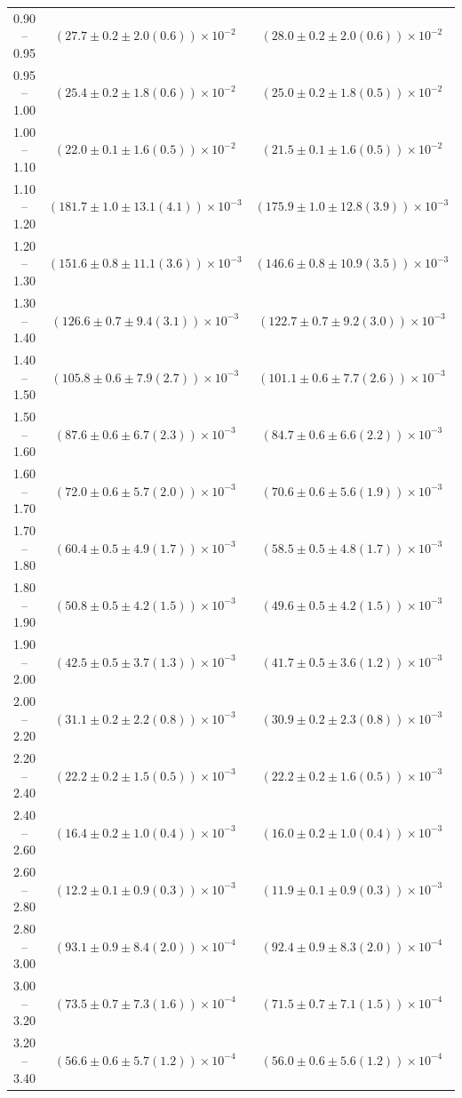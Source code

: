 \begin{table}
\begin{center}
\begin{tabular}{ c | c c }
0.90 -- 0.95 & $(27.7\pm0.2\pm2.0(0.6))\times10^{-2}$ & $(28.0\pm0.2\pm2.0(0.6))\times10^{-2}$ \\ 
0.95 -- 1.00 & $(25.4\pm0.2\pm1.8(0.6))\times10^{-2}$ & $(25.0\pm0.2\pm1.8(0.5))\times10^{-2}$ \\ 
1.00 -- 1.10 & $(22.0\pm0.1\pm1.6(0.5))\times10^{-2}$ & $(21.5\pm0.1\pm1.6(0.5))\times10^{-2}$ \\ 
1.10 -- 1.20 & $(181.7\pm1.0\pm13.1(4.1))\times10^{-3}$ & $(175.9\pm1.0\pm12.8(3.9))\times10^{-3}$ \\ 
1.20 -- 1.30 & $(151.6\pm0.8\pm11.1(3.6))\times10^{-3}$ & $(146.6\pm0.8\pm10.9(3.5))\times10^{-3}$ \\ 
1.30 -- 1.40 & $(126.6\pm0.7\pm9.4(3.1))\times10^{-3}$ & $(122.7\pm0.7\pm9.2(3.0))\times10^{-3}$ \\ 
1.40 -- 1.50 & $(105.8\pm0.6\pm7.9(2.7))\times10^{-3}$ & $(101.1\pm0.6\pm7.7(2.6))\times10^{-3}$ \\ 
1.50 -- 1.60 & $(87.6\pm0.6\pm6.7(2.3))\times10^{-3}$ & $(84.7\pm0.6\pm6.6(2.2))\times10^{-3}$ \\ 
1.60 -- 1.70 & $(72.0\pm0.6\pm5.7(2.0))\times10^{-3}$ & $(70.6\pm0.6\pm5.6(1.9))\times10^{-3}$ \\ 
1.70 -- 1.80 & $(60.4\pm0.5\pm4.9(1.7))\times10^{-3}$ & $(58.5\pm0.5\pm4.8(1.7))\times10^{-3}$ \\ 
1.80 -- 1.90 & $(50.8\pm0.5\pm4.2(1.5))\times10^{-3}$ & $(49.6\pm0.5\pm4.2(1.5))\times10^{-3}$ \\ 
1.90 -- 2.00 & $(42.5\pm0.5\pm3.7(1.3))\times10^{-3}$ & $(41.7\pm0.5\pm3.6(1.2))\times10^{-3}$ \\ 
2.00 -- 2.20 & $(31.1\pm0.2\pm2.2(0.8))\times10^{-3}$ & $(30.9\pm0.2\pm2.3(0.8))\times10^{-3}$ \\ 
2.20 -- 2.40 & $(22.2\pm0.2\pm1.5(0.5))\times10^{-3}$ & $(22.2\pm0.2\pm1.6(0.5))\times10^{-3}$ \\ 
2.40 -- 2.60 & $(16.4\pm0.2\pm1.0(0.4))\times10^{-3}$ & $(16.0\pm0.2\pm1.0(0.4))\times10^{-3}$ \\ 
2.60 -- 2.80 & $(12.2\pm0.1\pm0.9(0.3))\times10^{-3}$ & $(11.9\pm0.1\pm0.9(0.3))\times10^{-3}$ \\ 
2.80 -- 3.00 & $(93.1\pm0.9\pm8.4(2.0))\times10^{-4}$ & $(92.4\pm0.9\pm8.3(2.0))\times10^{-4}$ \\ 
3.00 -- 3.20 & $(73.5\pm0.7\pm7.3(1.6))\times10^{-4}$ & $(71.5\pm0.7\pm7.1(1.5))\times10^{-4}$ \\ 
3.20 -- 3.40 & $(56.6\pm0.6\pm5.7(1.2))\times10^{-4}$ & $(56.0\pm0.6\pm5.6(1.2))\times10^{-4}$ \\ 

\end{tabular}
\end{center}
\end{table}
